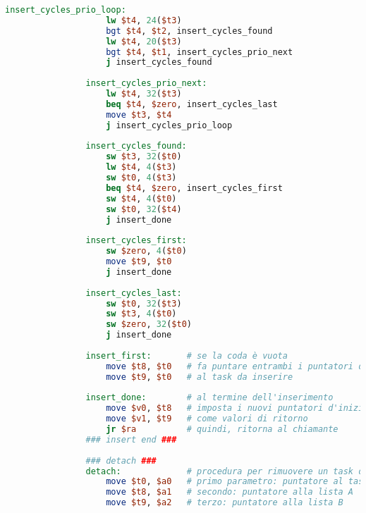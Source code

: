 \begin{center}
\begin{lstlisting}[language=mips, gobble=14, stepnumber=1]
                insert_cycles_prio_loop:
                    lw $t4, 24($t3)
                    bgt $t4, $t2, insert_cycles_found
                    lw $t4, 20($t3)
                    bgt $t4, $t1, insert_cycles_prio_next
                    j insert_cycles_found
                    
                insert_cycles_prio_next:
                    lw $t4, 32($t3)
                    beq $t4, $zero, insert_cycles_last
                    move $t3, $t4
                    j insert_cycles_prio_loop
                    
                insert_cycles_found:
                    sw $t3, 32($t0)
                    lw $t4, 4($t3)
                    sw $t0, 4($t3)
                    beq $t4, $zero, insert_cycles_first
                    sw $t4, 4($t0)
                    sw $t0, 32($t4)
                    j insert_done
                    
                insert_cycles_first:
                    sw $zero, 4($t0)
                    move $t9, $t0
                    j insert_done
                    
                insert_cycles_last:
                    sw $t0, 32($t3)
                    sw $t3, 4($t0)
                    sw $zero, 32($t0)
                    j insert_done
                    
                insert_first:       # se la coda è vuota
                    move $t8, $t0   # fa puntare entrambi i puntatori d'inizio (delle due liste)
                    move $t9, $t0   # al task da inserire
                    
                insert_done:        # al termine dell'inserimento
                    move $v0, $t8   # imposta i nuovi puntatori d'inizio delle due liste
                    move $v1, $t9   # come valori di ritorno
                    jr $ra          # quindi, ritorna al chiamante
                ### insert end ###
                
                ### detach ###
                detach:             # procedura per rimuovere un task dalle liste
                    move $t0, $a0   # primo parametro: puntatore al task da rimuovere
                    move $t8, $a1   # secondo: puntatore alla lista A
                    move $t9, $a2   # terzo: puntatore alla lista B
                    

\end{lstlisting}
\end{center}
